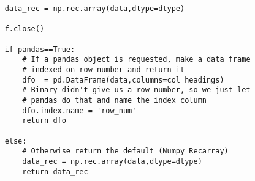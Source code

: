\begin{lstlisting}
    data_rec = np.rec.array(data,dtype=dtype)
    
    f.close()
    
    if pandas==True: 
        # If a pandas object is requested, make a data frame 
        # indexed on row number and return it
        dfo  = pd.DataFrame(data,columns=col_headings)
        # Binary didn't give us a row number, so we just let
        # pandas do that and name the index column
        dfo.index.name = 'row_num' 
        return dfo
        
    else:  
        # Otherwise return the default (Numpy Recarray)  
        data_rec = np.rec.array(data,dtype=dtype)
        return data_rec

\end{lstlisting}